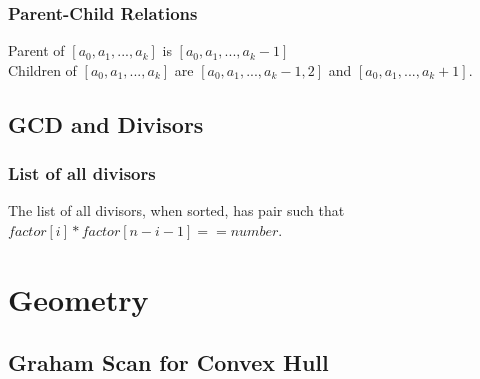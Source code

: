 \subsubsection{Parent-Child Relations}
Parent of $ [a_0, a_1, ..., a_k] $ is $ [a_0, a_1, ..., a_k-1] $ \\
Children of $[a_0, a_1, ..., a_k]$ are $[a_0, a_1, ..., a_k-1, 2]$ and $[a_0, a_1, ..., a_k+1]$.


\subsection{GCD and Divisors}

\subsubsection{List of all divisors}
The list of all divisors, when sorted, has pair such that $factor[i] * factor[n-i-1] == number$.



\section{Geometry}


\subsection{Graham Scan for Convex Hull}

